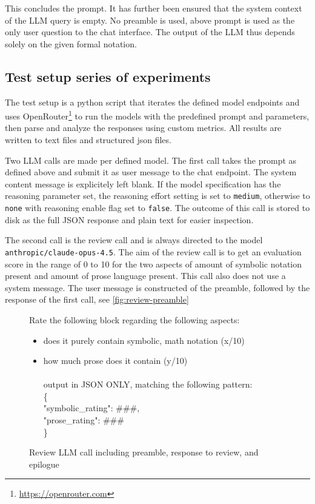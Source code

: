 This concludes the prompt. It has further been ensured that the system context of the LLM query is empty.
No preamble is used, above prompt is used as the only user question to the chat interface. 
The output of the LLM thus depends solely on the given formal notation.

\subsection{Test setup series of experiments}
The test setup is a python script that iterates the defined model endpoints and uses OpenRouter\footnote{\url{https://openrouter.com}} to 
run the models with the predefined prompt and parameters, then parse and analyze the responses using custom metrics.
All results are written to text files and structured json files. 

Two LLM calls are made per defined model. The first call takes the prompt as defined above and submit it as 
user message to the chat endpoint. The system content message is explicitely left blank.
If the model specification has the reasoning parameter set, the reasoning effort setting is set to \texttt{medium}, otherwise
to \texttt{none} with reasoning enable flag set to \texttt{false}.
The outcome of this call is stored to disk as the full JSON response and plain text for easier inspection.

The second call is the review call and is always directed to the model \texttt{anthropic/claude-opus-4.5}. The aim of
the review call is to get an evaluation score in the range of 0 to 10 for the two aspects of amount of symbolic notation present
and amount of prose language present. This call also does not use a system message. The user message is constructed of
the preamble, followed by the response of the first call, see \autoref{fig:review-preamble}

\begin{figure}[H]
  \begin{tcolorbox}[title=Review LLM call preamble/response/epilogue, colback=white, colframe=black]
    Rate the following block regarding the following aspects:

    \medskip
    \begin{itemize}
      \item does it purely contain symbolic, math notation (x/10)
      \item how much prose does it contain (y/10)
      \\<response from 1st call inserted here 1:1>
      \\output in JSON ONLY, matching the following pattern:
      \\\{
      \\    "symbolic\_rating": \#\#\#,
      \\    "prose\_rating": \#\#\#
      \\\}
    \end{itemize}
  \end{tcolorbox}
  \caption{Review LLM call including preamble, response to review, and epilogue}
  \label{fig:review-preamble}
\end{figure}

